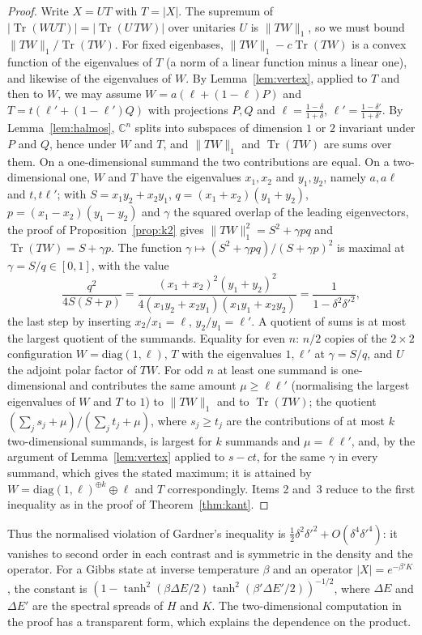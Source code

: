 \documentclass[11pt]{article}
\DeclareMathOperator{\Tr}{Tr}
\newcommand{\C}{\mathbb{C}}
\theoremstyle{plain}
\theoremstyle{definition}
\theoremstyle{remark}
\begin{document}
\begin{proof}
Write $X=UT$ with $T=|X|$. The supremum of $|\Tr(WUT)|=|\Tr(U\,TW)|$ over unitaries $U$ is $\|TW\|_1$, so we must bound
$\|TW\|_1/\Tr(TW)$. For fixed eigenbases, $\|TW\|_1-c\Tr(TW)$ is a convex function of the eigenvalues of $T$ (a norm of a
linear function minus a linear one), and likewise of the eigenvalues of $W$. By Lemma~\ref{lem:vertex}, applied to $T$ and
then to $W$, we may assume $W=a(\ell+(1-\ell)P)$ and $T=t(\ell'+(1-\ell')Q)$ with projections $P,Q$ and $\ell=\frac{1-\delta}{1+\delta}$,
$\ell'=\frac{1-\delta'}{1+\delta'}$. By Lemma~\ref{lem:halmos}, $\C^n$ splits into subspaces of dimension $1$ or $2$ invariant
under $P$ and $Q$, hence under $W$ and $T$, and $\|TW\|_1$ and $\Tr(TW)$ are sums over them. On a one-dimensional summand the
two contributions are equal. On a two-dimensional one, $W$ and $T$ have the eigenvalues $x_1,x_2$ and $y_1,y_2$, namely
$a,a\ell$ and $t,t\ell'$; with $S=x_1y_2+x_2y_1$, $q=(x_1+x_2)(y_1+y_2)$, $p=(x_1-x_2)(y_1-y_2)$ and $\gamma$ the squared overlap
of the leading eigenvectors, the proof of Proposition~\ref{prop:k2} gives $\|TW\|_1^2=S^2+\gamma pq$ and $\Tr(TW)=S+\gamma p$.
The function $\gamma\mapsto(S^2+\gamma pq)/(S+\gamma p)^2$ is maximal at $\gamma=S/q\in[0,1]$, with the value
\[
  \frac{q^2}{4S(S+p)}=\frac{(x_1+x_2)^2(y_1+y_2)^2}{4(x_1y_2+x_2y_1)(x_1y_1+x_2y_2)}=\frac1{1-\delta^2\delta'^2},
\]
the last step by inserting $x_2/x_1=\ell$, $y_2/y_1=\ell'$. A quotient of sums is at most the largest quotient of the
summands. Equality for even $n$: $n/2$ copies of the $2\times2$ configuration $W=\mathrm{diag}(1,\ell)$, $T$ with the
eigenvalues $1,\ell'$ at $\gamma=S/q$, and $U$ the adjoint polar factor of $TW$. For odd $n$ at least one summand is
one-dimensional and contributes the same amount $\mu\ge\ell\ell'$ (normalising the largest eigenvalues of $W$ and $T$
to $1$) to $\|TW\|_1$ and to $\Tr(TW)$; the quotient $(\sum_js_j+\mu)/(\sum_jt_j+\mu)$, where $s_j\ge t_j$ are the
contributions of at most $k$ two-dimensional summands, is largest for $k$ summands and $\mu=\ell\ell'$, and, by the argument
of Lemma~\ref{lem:vertex} applied to $s-ct$, for the same $\gamma$ in every summand, which gives the stated maximum; it is attained by
$W=\mathrm{diag}(1,\ell)^{\oplus k}\oplus\ell$ and $T$ correspondingly. Items 2 and~3 reduce to the first inequality as in
the proof of Theorem~\ref{thm:kant}.
\end{proof}

\noindent Thus the normalised violation of Gardner's inequality is $\frac12\delta^2\delta'^2+O(\delta^4\delta'^4)$: it
vanishes to second order in each contrast and is symmetric in the density and the operator. For a Gibbs state at inverse
temperature $\beta$ and an operator $|X|=e^{-\beta' K}$, the constant is $(1-\tanh^2(\beta\Delta E/2)\tanh^2(\beta'\Delta
E'/2))^{-1/2}$, where $\Delta E$ and $\Delta E'$ are the spectral spreads of $H$ and $K$. The two-dimensional computation in
the proof has a transparent form, which explains the dependence on the product.
\end{document}
